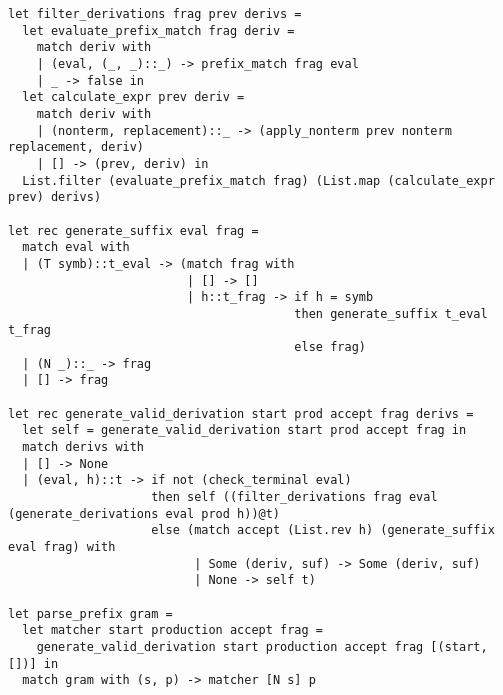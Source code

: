 \documentclass[8pt]{article}
\begin{document}
\begin{verbatim}
let filter_derivations frag prev derivs =
  let evaluate_prefix_match frag deriv =
    match deriv with
    | (eval, (_, _)::_) -> prefix_match frag eval
    | _ -> false in
  let calculate_expr prev deriv =
    match deriv with
    | (nonterm, replacement)::_ -> (apply_nonterm prev nonterm replacement, deriv)
    | [] -> (prev, deriv) in
  List.filter (evaluate_prefix_match frag) (List.map (calculate_expr prev) derivs)

let rec generate_suffix eval frag =
  match eval with
  | (T symb)::t_eval -> (match frag with
                         | [] -> []
                         | h::t_frag -> if h = symb
                                        then generate_suffix t_eval t_frag
                                        else frag)
  | (N _)::_ -> frag
  | [] -> frag

let rec generate_valid_derivation start prod accept frag derivs =
  let self = generate_valid_derivation start prod accept frag in
  match derivs with
  | [] -> None
  | (eval, h)::t -> if not (check_terminal eval)
                    then self ((filter_derivations frag eval (generate_derivations eval prod h))@t)
                    else (match accept (List.rev h) (generate_suffix eval frag) with
                          | Some (deriv, suf) -> Some (deriv, suf)
                          | None -> self t)

let parse_prefix gram =
  let matcher start production accept frag =
    generate_valid_derivation start production accept frag [(start, [])] in
  match gram with (s, p) -> matcher [N s] p
\end{verbatim}
\end{document}

